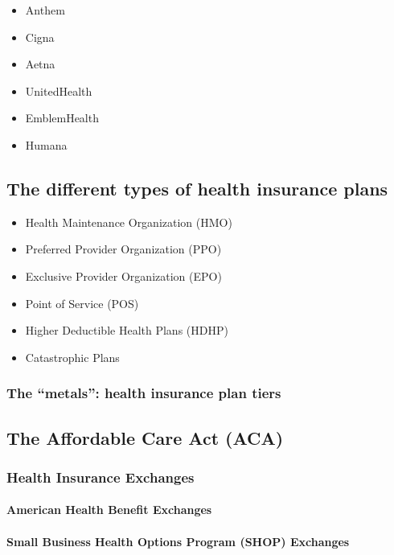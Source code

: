 \documentclass{article}
\begin{document}
\begin{itemize}
\item Anthem
\item Cigna
\item Aetna
\item UnitedHealth
\item EmblemHealth
\item Humana
\end{itemize}

\subsection{The different types of health insurance plans}

\begin{itemize}
\item Health Maintenance Organization (HMO)
\item Preferred Provider Organization (PPO)
\item Exclusive Provider Organization (EPO)
\item Point of Service (POS)
\item Higher Deductible Health Plans (HDHP)
\item Catastrophic Plans
\end{itemize}

\subsubsection{The ``metals'': health insurance plan tiers}


\subsection{The Affordable Care Act (ACA)}

\subsubsection{Health Insurance Exchanges}

\paragraph{American Health Benefit Exchanges}

\paragraph{Small Business Health Options Program (SHOP) Exchanges}
\end{document}
